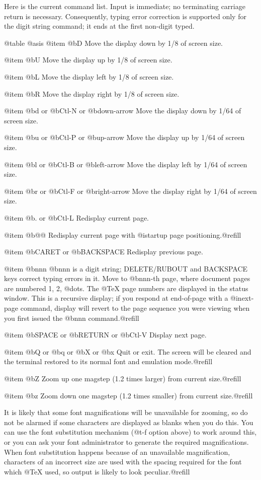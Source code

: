 {Here is the current command list.  Input is immediate; no
terminating carriage return is necessary.  Consequently, typing
error correction is supported only for the digit string command;
it ends at the first non-digit typed.

@table @asis
@item @b{D}
Move the display down by 1/8 of screen size.

@item @b{U}
Move the display up by 1/8 of screen size.

@item @b{L}
Move the display left by 1/8 of screen size.

@item @b{R}
Move the display right by 1/8 of screen size.

@item @b{d} or @b{Ctl-N} or @b{down-arrow}
Move the display down by 1/64 of screen size.

@item @b{u} or @b{Ctl-P} or @b{up-arrow}
Move the display up by 1/64 of screen size.

@item @b{l} or @b{Ctl-B} or @b{left-arrow}
Move the display left by 1/64 of screen size.

@item @b{r} or @b{Ctl-F} or @b{right-arrow}
Move the display right by 1/64 of screen size.

@item @b{.} or @b{Ctl-L}
Redisplay current page.

@item @b{@@}
Redisplay current page with @i{startup} page
positioning.@refill

@item @b{CARET} or @b{BACKSPACE}
Redisplay previous page.

@item @b{nnn}
@b{nnn} is a digit string; DELETE/RUBOUT and BACKSPACE keys
correct typing errors in it.  Move to @b{nnn}-th page, where
document pages are numbered 1, 2, @dots{}.  The @TeX{}
page numbers are displayed in the status window. This is a
recursive display; if you respond at end-of-page with a
@i{next-page} command, display will revert to the page
sequence you were viewing when you first issued the @b{nnn}
command.@refill

@item @b{SPACE} or @b{RETURN} or @b{Ctl-V}
Display next page.

@item @b{Q} or @b{q} or @b{X} or @b{x}
Quit or exit.  The screen will be cleared and the terminal
restored to its normal font and emulation mode.@refill

@item @b{Z}
Zoom up one magstep (1.2 times larger) from current
size.@refill

@item @b{z}
Zoom down one magstep (1.2 times smaller) from current
size.@refill

It is likely that some font magnifications will be
unavailable for zooming, so do not be alarmed if some
characters are displayed as blanks when you do this.  You
can use the font substitution mechanism (@t{-f} option
above) to work around this, or you can ask your font
administrator to generate the required magnifications.
When font substitution happens because of an unavailable
magnification, characters of an incorrect size are used
with the spacing required for the font which @TeX{} used,
so output is likely to look peculiar.@refill

}
